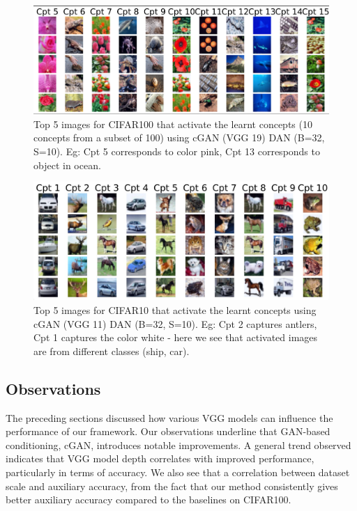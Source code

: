 \documentclass[letterpaper]{article}
\begin{document}
\begin{figure}[h!]
    \centering
    \includegraphics[width=1.0\columnwidth]{images/CGAN_19_32_10_1_cifar100.png}
    \caption{Top 5 images for CIFAR100 that activate the learnt concepts (10 concepts from a subset of 100) using cGAN (VGG 19) DAN  (B=32, S=10). Eg: Cpt 5 corresponds to color pink, Cpt 13 corresponds to object in ocean.}
    \label{fig:cgan_19_cifar100}
\end{figure}

\begin{figure}
    \centering
    \includegraphics[width=1.0\columnwidth]{images/cgan11.jpg}
    \caption{Top 5 images for CIFAR10 that activate the learnt concepts using cGAN (VGG 11) DAN  (B=32, S=10). Eg: Cpt 2 captures antlers, Cpt 1 captures the color white - here we see that activated images are from different classes (ship, car).}
    \label{fig:cgan11}
\end{figure}

\subsection{Observations}\label{sec:observations}
The preceding sections discussed how various VGG models can influence the performance of our framework. Our observations underline that GAN-based conditioning, cGAN, introduces notable improvements. 
A general trend observed indicates that VGG model depth correlates with improved performance, particularly in terms of accuracy. 
We also see that a correlation between dataset scale and auxiliary accuracy, from the fact that our method consistently gives better auxiliary accuracy compared to the baselines on CIFAR100.
\end{document}
